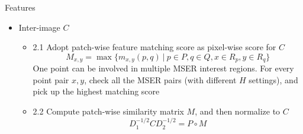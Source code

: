 \documentclass[12pt]{beamer}
\begin{document}
\begin{frame}{Features}
    \begin{itemize}
        \item Inter-image $C$
        \begin{itemize}
            \item 2.1 Adopt patch-wise feature matching score as pixel-wise score for $C$
            \[M_{x, y} = \max\{m_{x, y}(p, q) \ | \ p\in P, q \in Q, x \in R_p, y \in R_q\}\]
            One point can be involved in multiple MSER interest regions. For every point pair $x, y$, check all the MSER pairs (with different $H$ settings), and pick up the highest matching score
            \item 2.2 Compute patch-wise similarity matrix $M$, and then normalize to $C$
            \[D^{-1/2}_1CD^{-1/2}_2 = P \circ M\]
        \end{itemize}
    \end{itemize}
\end{frame}
\end{document}
